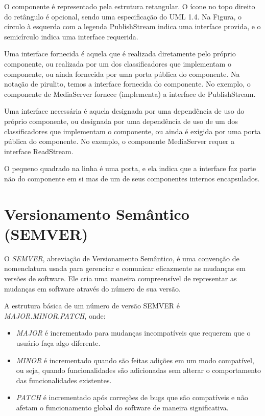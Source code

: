 \documentclass[12pt, %
openright, 
oneside, %
a4paper,    %
brazil]{facom-ufu-abntex2}
\begin{document}
O componente é representado pela estrutura retangular. O ícone no topo direito
do retângulo é opcional, sendo uma especificação do UML 1.4. Na Figura, o
círculo à esquerda com a legenda PublishStream indica uma interface provida, e
o semicírculo indica uma interface requerida.

Uma interface fornecida é aquela que é realizada diretamente pelo próprio
componente, ou realizada por um dos classificadores que implementam o
componente, ou ainda fornecida por uma porta pública do componente. Na notação
de pirulito, temos a interface fornecida do componente. No exemplo, o
componente de MediaServer fornece (implementa) a interface de PublishStream.

Uma interface necessária é aquela designada por uma dependência de uso do
próprio componente, ou designada por uma dependência de uso de um dos
classificadores que implementam o componente, ou ainda é exigida por uma porta
pública do componente. No exemplo, o componente MediaServer requer a interface
ReadStream.

O pequeno quadrado na linha é uma porta, e ela indica que a interface faz parte
não do componente em si mas de um de seus componentes internos encapsulados.

\section{Versionamento Semântico (SEMVER)}

O \textit{SEMVER}, abreviação de Versionamento Semântico, é uma convenção de
nomenclatura usada para gerenciar e comunicar eficazmente as mudanças em
versões de software. Ele cria uma maneira compreensível de representar as
mudanças em software através do número de sua versão.

A estrutura básica de um número de versão SEMVER é \textit{MAJOR.MINOR.PATCH},
onde:

\begin{itemize}
	\item \textit{MAJOR} é incrementado para mudanças incompatíveis que requerem que o usuário faça algo diferente.
	\item \textit{MINOR} é incrementado quando são feitas adições em um modo compatível, ou seja, quando funcionalidades são adicionadas sem alterar o comportamento das funcionalidades existentes.
	\item \textit{PATCH} é incrementado após correções de bugs que são compatíveis e não afetam o funcionamento global do software de maneira significativa.
\end{itemize}
\end{document}
